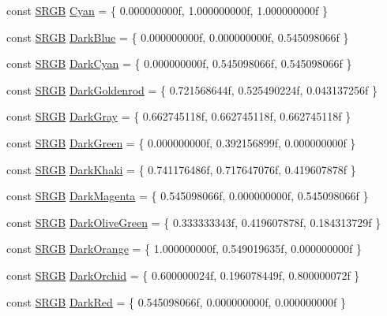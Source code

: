 \begin{DoxyCompactItemize}
const \hyperlink{structmage_1_1_s_r_g_b}{S\+R\+GB} \hyperlink{namespacemage_1_1color_ae00e5442ad8cee99d495cc16f719086d}{Cyan} = \{ 0.\+000000000f, 1.\+000000000f, 1.\+000000000f \}
\item 
const \hyperlink{structmage_1_1_s_r_g_b}{S\+R\+GB} \hyperlink{namespacemage_1_1color_a6dea3a266564281f1adf71a04753d6b4}{Dark\+Blue} = \{ 0.\+000000000f, 0.\+000000000f, 0.\+545098066f \}
\item 
const \hyperlink{structmage_1_1_s_r_g_b}{S\+R\+GB} \hyperlink{namespacemage_1_1color_a3e4eb4ccd282eeb2e7404ca03954a1a5}{Dark\+Cyan} = \{ 0.\+000000000f, 0.\+545098066f, 0.\+545098066f \}
\item 
const \hyperlink{structmage_1_1_s_r_g_b}{S\+R\+GB} \hyperlink{namespacemage_1_1color_a6065b0a2e7d3ac34d87fd4bddea4f034}{Dark\+Goldenrod} = \{ 0.\+721568644f, 0.\+525490224f, 0.\+043137256f \}
\item 
const \hyperlink{structmage_1_1_s_r_g_b}{S\+R\+GB} \hyperlink{namespacemage_1_1color_aa49fddaa3c5449f09c03175c05860f93}{Dark\+Gray} = \{ 0.\+662745118f, 0.\+662745118f, 0.\+662745118f \}
\item 
const \hyperlink{structmage_1_1_s_r_g_b}{S\+R\+GB} \hyperlink{namespacemage_1_1color_a2fd0bacaaa0a787a63e57ee2fa2c36d7}{Dark\+Green} = \{ 0.\+000000000f, 0.\+392156899f, 0.\+000000000f \}
\item 
const \hyperlink{structmage_1_1_s_r_g_b}{S\+R\+GB} \hyperlink{namespacemage_1_1color_a6067beada8098c967b59540bdb11d13a}{Dark\+Khaki} = \{ 0.\+741176486f, 0.\+717647076f, 0.\+419607878f \}
\item 
const \hyperlink{structmage_1_1_s_r_g_b}{S\+R\+GB} \hyperlink{namespacemage_1_1color_a936a9b8794ac78320d7af30b9a85e2ed}{Dark\+Magenta} = \{ 0.\+545098066f, 0.\+000000000f, 0.\+545098066f \}
\item 
const \hyperlink{structmage_1_1_s_r_g_b}{S\+R\+GB} \hyperlink{namespacemage_1_1color_a66b01c0bcb06aa90694ddb1a385ed666}{Dark\+Olive\+Green} = \{ 0.\+333333343f, 0.\+419607878f, 0.\+184313729f \}
\item 
const \hyperlink{structmage_1_1_s_r_g_b}{S\+R\+GB} \hyperlink{namespacemage_1_1color_a60b81cf047f12b1fb5d77d25a6be2b00}{Dark\+Orange} = \{ 1.\+000000000f, 0.\+549019635f, 0.\+000000000f \}
\item 
const \hyperlink{structmage_1_1_s_r_g_b}{S\+R\+GB} \hyperlink{namespacemage_1_1color_aae45221c3b076b9d381514cdc0f46138}{Dark\+Orchid} = \{ 0.\+600000024f, 0.\+196078449f, 0.\+800000072f \}
\item 
const \hyperlink{structmage_1_1_s_r_g_b}{S\+R\+GB} \hyperlink{namespacemage_1_1color_abaa09a362eaca9de1c1cb2da6fa13f8a}{Dark\+Red} = \{ 0.\+545098066f, 0.\+000000000f, 0.\+000000000f \}

\end{DoxyCompactItemize}
